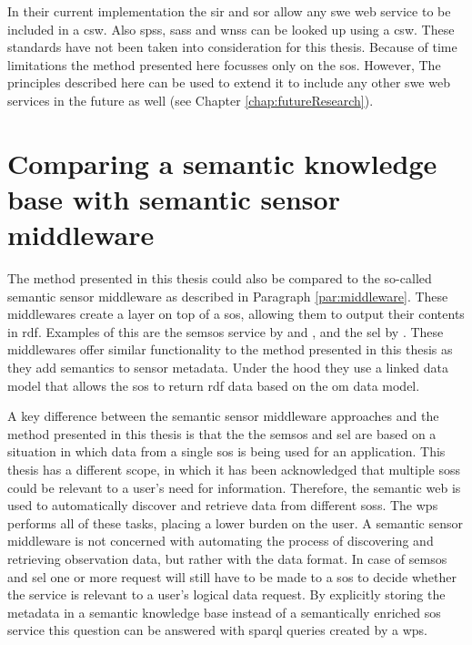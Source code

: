 In their current implementation the \ac{sir} and \ac{sor} allow any \ac{swe} web service to be included in a \ac{csw}. Also \aclp{sps}, \aclp{sas} and \aclp{wns} can be looked up using a \ac{csw}. These standards have not been taken into consideration for this thesis. Because of time limitations the method presented here focusses only on the \ac{sos}. However, The principles described here can be used to extend it to include any other \ac{swe} web services in the future as well (see Chapter \ref{chap:futureResearch}).        

\section{Comparing a semantic knowledge base with semantic sensor middleware}
The method presented in this thesis could also be compared to the so-called semantic sensor middleware as described in Paragraph \ref{par:middleware}. These middlewares create a layer on top of a \ac{sos}, allowing them to output their contents in \ac{rdf}. Examples of this are the \acf{semsos} service by \cite{SSW:Henson} and \cite{SSW:Pschorr}, and the \acf{sel} by \cite{SSW:Janowicz}. These middlewares offer similar functionality to the method presented in this thesis as they add semantics to sensor metadata. Under the hood they use a linked data model that allows the \ac{sos} to return \ac{rdf} data based on the \ac{om} data model. 

A key difference between the semantic sensor middleware approaches and the method presented in this thesis is that the the \ac{semsos} and \ac{sel} are based on a situation in which data from a single \ac{sos} is being used for an application. This thesis has a different scope, in which it has been acknowledged that multiple \aclp{sos} could be relevant to a user's need for information. Therefore, the semantic web is used to automatically discover and retrieve data from different \aclp{sos}. The \ac{wps} performs all of these tasks, placing a lower burden on the user. A semantic sensor middleware is not concerned with automating the process of discovering and retrieving observation data, but rather with the data format. In case of \ac{semsos} and \ac{sel} one or more request will still have to be made to a \ac{sos} to decide whether the service is relevant to a user's logical data request. By explicitly storing the metadata in a semantic knowledge base instead of a semantically enriched \ac{sos} service this question can be answered with \ac{sparql} queries created by a \ac{wps}.      


